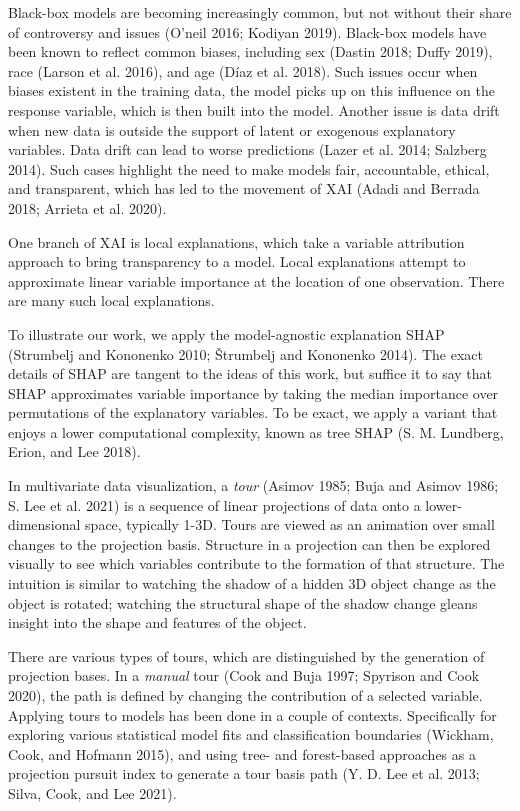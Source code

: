 \documentclass[
  article]{article}
\begin{document}
Black-box models are becoming increasingly common, but not without their share of controversy and issues (O'neil 2016; Kodiyan 2019). Black-box models have been known to reflect common biases, including sex (Dastin 2018; Duffy 2019), race (Larson et al. 2016), and age (Díaz et al. 2018). Such issues occur when biases existent in the training data, the model picks up on this influence on the response variable, which is then built into the model. Another issue is data drift when new data is outside the support of latent or exogenous explanatory variables. Data drift can lead to worse predictions (Lazer et al. 2014; Salzberg 2014). Such cases highlight the need to make models fair, accountable, ethical, and transparent, which has led to the movement of XAI (Adadi and Berrada 2018; Arrieta et al. 2020).

One branch of XAI is local explanations, which take a variable attribution approach to bring transparency to a model. Local explanations attempt to approximate linear variable importance at the location of one observation. There are many such local explanations.

To illustrate our work, we apply the model-agnostic explanation SHAP (Strumbelj and Kononenko 2010; Štrumbelj and Kononenko 2014). The exact details of SHAP are tangent to the ideas of this work, but suffice it to say that SHAP approximates variable importance by taking the median importance over permutations of the explanatory variables. To be exact, we apply a variant that enjoys a lower computational complexity, known as tree SHAP (S. M. Lundberg, Erion, and Lee 2018).

In multivariate data visualization, a \emph{tour} (Asimov 1985; Buja and Asimov 1986; S. Lee et al. 2021) is a sequence of linear projections of data onto a lower-dimensional space, typically 1-3D. Tours are viewed as an animation over small changes to the projection basis. Structure in a projection can then be explored visually to see which variables contribute to the formation of that structure. The intuition is similar to watching the shadow of a hidden 3D object change as the object is rotated; watching the structural shape of the shadow change gleans insight into the shape and features of the object.

There are various types of tours, which are distinguished by the generation of projection bases. In a \emph{manual} tour (Cook and Buja 1997; Spyrison and Cook 2020), the path is defined by changing the contribution of a selected variable. Applying tours to models has been done in a couple of contexts. Specifically for exploring various statistical model fits and classification boundaries (Wickham, Cook, and Hofmann 2015), and using tree- and forest-based approaches as a projection pursuit index to generate a tour basis path (Y. D. Lee et al. 2013; Silva, Cook, and Lee 2021).
\end{document}
